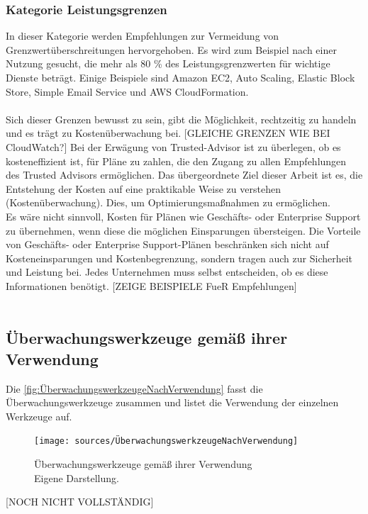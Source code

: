 \subsubsection*{Kategorie Leistungsgrenzen}
In dieser Kategorie werden Empfehlungen zur Vermeidung von Grenzwertüberschreitungen hervorgehoben.
Es wird zum Beispiel nach einer Nutzung gesucht, die mehr als 80 \% des Leistungsgrenzwerten für wichtige Dienste beträgt. Einige Beispiele sind  Amazon EC2, Auto Scaling, Elastic Block Store, Simple Email Service und AWS CloudFormation.
\\\\
Sich dieser Grenzen bewusst zu sein, gibt die Möglichkeit, rechtzeitig zu handeln und es trägt zu Kostenüberwachung bei.
[GLEICHE GRENZEN WIE BEI CloudWatch?]
Bei der Erwägung von Trusted-Advisor ist zu überlegen, ob es kosteneffizient ist, für Pläne zu zahlen, die den Zugang zu allen Empfehlungen des Trusted Advisors ermöglichen. Das übergeordnete Ziel dieser Arbeit ist es, die Entstehung der Kosten auf eine praktikable Weise zu verstehen (Kostenüberwachung). Dies, um Optimierungsmaßnahmen zu ermöglichen. 
\\
Es wäre nicht sinnvoll, Kosten für Plänen wie Geschäfts- oder Enterprise Support zu übernehmen, wenn diese die möglichen Einsparungen übersteigen.  Die Vorteile von Geschäfts- oder Enterprise Support-Plänen beschränken sich nicht auf Kosteneinsparungen und Kostenbegrenzung, sondern tragen auch zur Sicherheit und Leistung bei. Jedes Unternehmen muss selbst entscheiden, ob es diese Informationen benötigt.
[ZEIGE BEISPIELE FueR Empfehlungen]\\
\\
\subsection{Überwachungswerkzeuge gemäß ihrer Verwendung}
Die \autoref{fig:ÜberwachungswerkzeugeNachVerwendung} fasst die Überwachungswerkzeuge zusammen und listet die Verwendung der einzelnen Werkzeuge auf.
\begin{figure}[h!]
  \centering
  \texttt{[image: sources/ÜberwachungswerkzeugeNachVerwendung]}
  \caption[Überwachungswerkzeuge gemäß ihrer Verwendung]{}
  \label{fig:ÜberwachungswerkzeugeNachVerwendung} 
  Überwachungswerkzeuge gemäß ihrer Verwendung\\
  Eigene Darstellung\cite{AMZ12, AMZ20, AMZ21}. 
\end{figure}
[NOCH NICHT VOLLSTÄNDIG]

